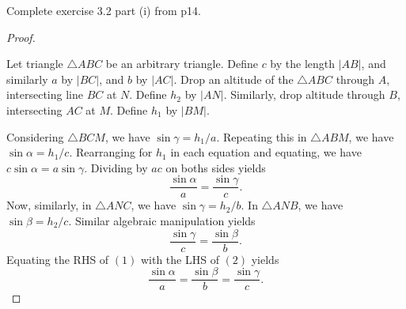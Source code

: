 \documentclass[11pt]{article}
\begin{document}
\begin{question}
    Complete exercise 3.2 part (i) from p14.
\end{question}


\begin{proof}
    {}\ 


    Let triangle $\triangle ABC$ be an arbitrary triangle.
    Define $c$ by the length $|AB|$,
    and similarly $a$ by $|BC|$, and $b$ by $|AC|$.
    Drop an altitude of the $\triangle ABC$ through $A$,
    intersecting line $BC$ at $N$. Define $h_{2}$ by $|AN|$.
    Similarly, drop altitude through $B$,
    intersecting $AC$ at $M$. Define $h_{1}$ by $|BM|$.

    Considering $\triangle BCM$, we have $\sin\gamma = h_{1}/a$.
    Repeating this in $\triangle ABM$, we have $\sin\alpha = h_{1}/c$.
    Rearranging for $h_{1}$ in each equation and equating,
    we have $c\sin\alpha = a\sin\gamma $. 
    Dividing by $ac$ on boths sides yields
    \begin{equation}
    \frac{\sin\alpha }{a} = \frac{\sin\gamma }{c}.
    \end{equation}
    Now, similarly,
    in $\triangle ANC$, we have $\sin\gamma = h_{2}/b$.
    In $\triangle ANB$, we have $\sin\beta = h_{2}/c$.
    Similar algebraic manipulation yields
    \begin{equation}
    \frac{\sin\gamma }{c} = \frac{\sin\beta }{b}.
    \end{equation}
    Equating the RHS of $(1)$ with the LHS of $(2)$ yields
    \[
    \frac{\sin\alpha }{a} = \frac{\sin\beta }{b} = \frac{\sin\gamma }{c}.
    \]
\end{proof}
\end{document}
